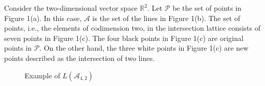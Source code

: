 \documentclass{wstmp}
\begin{document}
\begin{example}
Consider the two-dimensional vector space ${\mathbb{R}}^2$.
Let ${\mathcal{P}}$ be the set of points in Figure 1(a). 
In this case,
${\mathcal{A}}$ is the set of the lines in  Figure 1(b). 
The set of points, i.e., the elements of codimension two, in the intersection lattice
consists of seven points in  Figure 1(c). 
The four black points in  Figure 1(c) 
are original points in ${\mathcal{P}}$.
On the other hand,
the three white points in  Figure 1(c) 
are 
new points described as the intersection of two lines.
\begin{figure}[t]
\hfill
{}
\label{fig:1-1}
\hfill
{}
\label{fig:1-2}
\hfill
{}
\label{fig:1-3}
\hfill{}
\caption{Example of $L({\mathcal{A}}_{4,2})$}
\end{figure}
\end{example}
\end{document}
